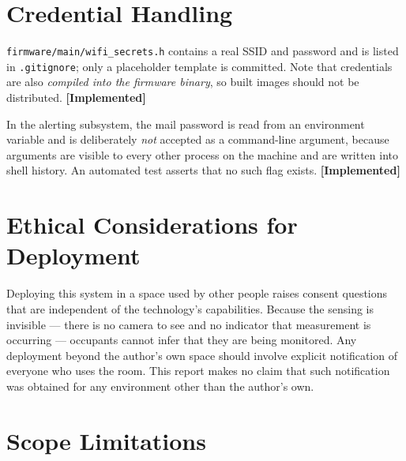 \documentclass[11pt,a4paper,oneside]{report}
\newcommand{\evidencetag}[2]{{\small\sffamily\bfseries\textcolor{#1}{[#2]}}}
\newcommand{\Impl}{\evidencetag{good}{Implemented}}
\newcommand{\code}[1]{\texttt{\small #1}}
\begin{document}
\section{Credential Handling}

\code{firmware/main/wifi\_secrets.h} contains a real SSID and password and is
listed in \code{.gitignore}; only a placeholder template is committed. Note
that credentials are also \emph{compiled into the firmware binary}, so built
images should not be distributed. \Impl

In the alerting subsystem, the mail password is read from an environment
variable and is deliberately \emph{not} accepted as a command-line argument,
because arguments are visible to every other process on the machine and are
written into shell history. An automated test asserts that no such flag exists.
\Impl

\section{Ethical Considerations for Deployment}

Deploying this system in a space used by other people raises consent questions
that are independent of the technology's capabilities. Because the sensing is
invisible --- there is no camera to see and no indicator that measurement is
occurring --- occupants cannot infer that they are being monitored. Any
deployment beyond the author's own space should involve explicit notification
of everyone who uses the room. This report makes no claim that such
notification was obtained for any environment other than the author's own.


\label{ch:limits}

\section{Scope Limitations}
\end{document}
